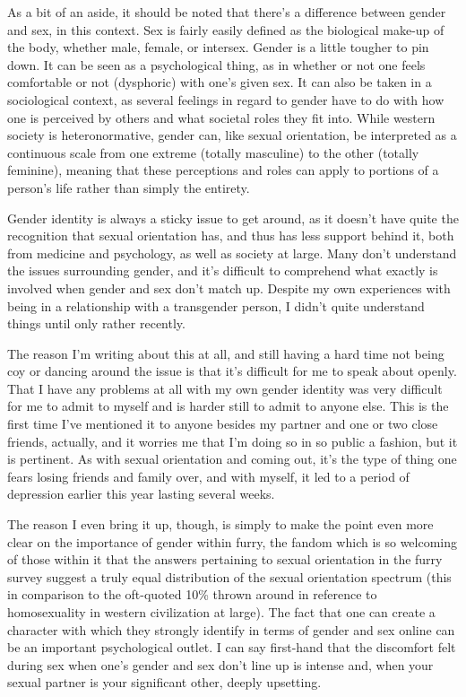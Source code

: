 As a bit of an aside, it should be noted that there's a difference between gender and sex, in this context. Sex is fairly easily defined as the biological make-up of the body, whether male, female, or intersex. Gender is a little tougher to pin down. It can be seen as a psychological thing, as in whether or not one feels comfortable or not (dysphoric) with one's given sex. It can also be taken in a sociological context, as several feelings in regard to gender have to do with how one is perceived by others and what societal roles they fit into. While western society is heteronormative, gender can, like sexual orientation, be interpreted as a continuous scale from one extreme (totally masculine) to the other (totally feminine), meaning that these perceptions and roles can apply to portions of a person's life rather than simply the entirety.

Gender identity is always a sticky issue to get around, as it doesn't have quite the recognition that sexual orientation has, and thus has less support behind it, both from medicine and psychology, as well as society at large. Many don't understand the issues surrounding gender, and it's difficult to comprehend what exactly is involved when gender and sex don't match up. Despite my own experiences with being in a relationship with a transgender person, I didn't quite understand things until only rather recently.

The reason I'm writing about this at all, and still having a hard time not being coy or dancing around the issue is that it's difficult for me to speak about openly. That I have any problems at all with my own gender identity was very difficult for me to admit to myself and is harder still to admit to anyone else. This is the first time I've mentioned it to anyone besides my partner and one or two close friends, actually, and it worries me that I'm doing so in so public a fashion, but it is pertinent. As with sexual orientation and coming out, it's the type of thing one fears losing friends and family over, and with myself, it led to a period of depression earlier this year lasting several weeks.

The reason I even bring it up, though, is simply to make the point even more clear on the importance of gender within furry, the fandom which is so welcoming of those within it that the answers pertaining to sexual orientation in the furry survey suggest a truly equal distribution of the sexual orientation spectrum (this in comparison to the oft-quoted 10\% thrown around in reference to homosexuality in western civilization at large). The fact that one can create a character with which they strongly identify in terms of gender and sex online can be an important psychological outlet. I can say first-hand that the discomfort felt during sex when one's gender and sex don't line up is intense and, when your sexual partner is your significant other, deeply upsetting.

